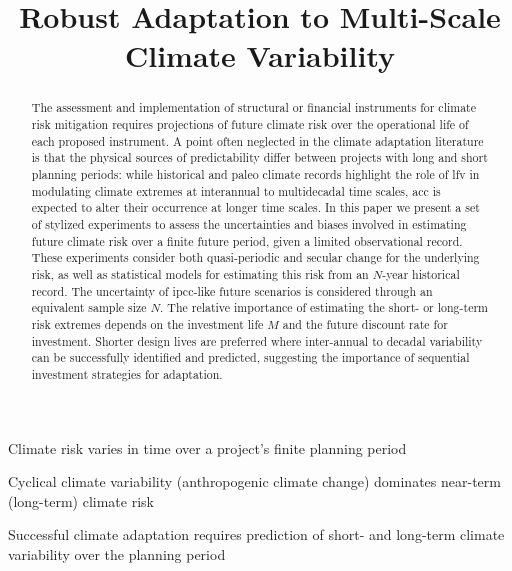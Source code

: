 \documentclass[
  draft,
  linenumbers
]{agujournal2018}
\begin{document}
\title{Robust Adaptation to Multi-Scale Climate Variability}

\begin{keypoints}
  \item Climate risk varies in time over a project's finite planning period
  \item Cyclical climate variability (anthropogenic climate change) dominates near-term (long-term) climate risk
  \item Successful climate adaptation requires prediction of short- and long-term climate variability over the planning period
\end{keypoints}

\begin{abstract}
  The assessment and implementation of structural or financial instruments for climate risk mitigation requires projections of future climate risk over the operational life of each proposed instrument.
  A point often neglected in the climate adaptation literature is that the physical sources of predictability differ between projects with long and short planning periods: while historical and paleo climate records highlight the role of \acrlong{lfv} in modulating climate extremes at interannual to multidecadal time scales, \acrlong{acc} is expected to alter their occurrence at longer time scales.
  In this paper we present a set of stylized experiments to assess the uncertainties and biases involved in estimating future climate risk over a finite future period, given a limited observational record.
  These experiments consider both quasi-periodic and secular change for the underlying risk, as well as statistical models for estimating this risk from an $N$-year historical record.
  The uncertainty of \acrshort{ipcc}-like future scenarios is considered through an equivalent sample size $N$. 
  The relative importance of estimating the short- or long-term risk extremes depends on the investment life $M$ and the future discount rate for investment.
  Shorter design lives are preferred where inter-annual to decadal variability can be successfully identified and predicted, suggesting the importance of sequential investment strategies for adaptation. 
\end{abstract}
\end{document}
